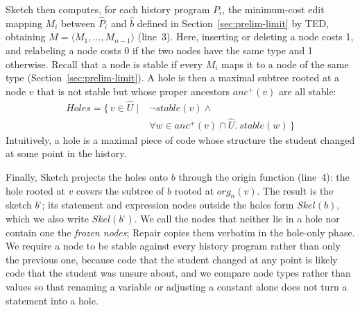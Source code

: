 \documentclass[10pt,conference]{IEEEtran}
\begin{document}
Sketch then computes, for each history program $P_i$, the minimum-cost edit mapping $M_i$ between $\hat{P}_i$ and $\hat{b}$ defined in Section~\ref{sec:prelim-limit} by TED, obtaining $M = \langle M_1, \ldots, M_{n-1} \rangle$ (line~3). Here, inserting or deleting a node costs 1, and relabeling a node costs 0 if the two nodes have the same type and 1 otherwise. Recall that a node is stable if every $M_i$ maps it to a node of the same type (Section~\ref{sec:prelim-limit}). A hole is then a maximal subtree rooted at a node $v$ that is not stable but whose proper ancestors $\mathit{anc}^{+}(v)$ are all stable:
\[ \begin{aligned} \mathit{Holes} = \{\, v \in \hat{U} \mid{} & \neg\mathit{stable}(v) \wedge {} \\ & \forall w \in \mathit{anc}^{+}(v) \cap \hat{U}.\ \mathit{stable}(w) \,\} \end{aligned} \]
Intuitively, a hole is a maximal piece of code whose structure the student changed at some point in the history.

Finally, Sketch projects the holes onto $b$ through the origin function (line~4): the hole rooted at $v$ covers the subtree of $b$ rooted at $\mathit{org}_n(v)$. The result is the sketch $b^{\square}$; its statement and expression nodes outside the holes form $\mathit{Skel}(b)$, which we also write $\mathit{Skel}(b^{\square})$. We call the nodes that neither lie in a hole nor contain one the \emph{frozen nodes}; Repair copies them verbatim in the hole-only phase. We require a node to be stable against every history program rather than only the previous one, because code that the student changed at any point is likely code that the student was unsure about, and we compare node types rather than values so that renaming a variable or adjusting a constant alone does not turn a statement into a hole.
\end{document}
